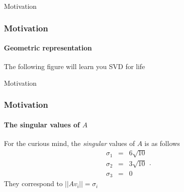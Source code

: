 \documentclass{beamer}
\begin{document}

\begin{frame}{Motivation}

\frametitle{Motivation}
\framesubtitle{Geometric representation}
The following figure will learn you SVD for life
\begin{figure}[h] 
\end{figure}  


\end{frame}


\begin{frame}{Motivation}

\frametitle{Motivation}
\framesubtitle{The singular values of $A$}

For the curious mind, the \emph{singular} values of $A$ is as follows
\begin{equation*}
\begin{aligned}
\sigma_1 & = & 6\sqrt{10} \\
\sigma_2 & = & 3\sqrt{10} \\
\sigma_3 & = & 0
\end{aligned}.
\end{equation*}
They correspond to $||Av_i|| = \sigma_i $
\end{frame}
\end{document}
